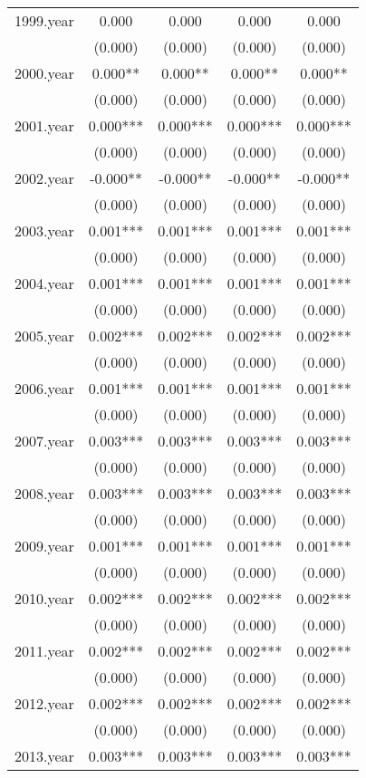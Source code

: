 \documentclass[]{article}
\begin{document}
\begin{tabular}{lcccc}
1999.year & 0.000 & 0.000 & 0.000 & 0.000 \\
 & (0.000) & (0.000) & (0.000) & (0.000) \\
2000.year & 0.000** & 0.000** & 0.000** & 0.000** \\
 & (0.000) & (0.000) & (0.000) & (0.000) \\
2001.year & 0.000*** & 0.000*** & 0.000*** & 0.000*** \\
 & (0.000) & (0.000) & (0.000) & (0.000) \\
2002.year & -0.000** & -0.000** & -0.000** & -0.000** \\
 & (0.000) & (0.000) & (0.000) & (0.000) \\
2003.year & 0.001*** & 0.001*** & 0.001*** & 0.001*** \\
 & (0.000) & (0.000) & (0.000) & (0.000) \\
2004.year & 0.001*** & 0.001*** & 0.001*** & 0.001*** \\
 & (0.000) & (0.000) & (0.000) & (0.000) \\
2005.year & 0.002*** & 0.002*** & 0.002*** & 0.002*** \\
 & (0.000) & (0.000) & (0.000) & (0.000) \\
2006.year & 0.001*** & 0.001*** & 0.001*** & 0.001*** \\
 & (0.000) & (0.000) & (0.000) & (0.000) \\
2007.year & 0.003*** & 0.003*** & 0.003*** & 0.003*** \\
 & (0.000) & (0.000) & (0.000) & (0.000) \\
2008.year & 0.003*** & 0.003*** & 0.003*** & 0.003*** \\
 & (0.000) & (0.000) & (0.000) & (0.000) \\
2009.year & 0.001*** & 0.001*** & 0.001*** & 0.001*** \\
 & (0.000) & (0.000) & (0.000) & (0.000) \\
2010.year & 0.002*** & 0.002*** & 0.002*** & 0.002*** \\
 & (0.000) & (0.000) & (0.000) & (0.000) \\
2011.year & 0.002*** & 0.002*** & 0.002*** & 0.002*** \\
 & (0.000) & (0.000) & (0.000) & (0.000) \\
2012.year & 0.002*** & 0.002*** & 0.002*** & 0.002*** \\
 & (0.000) & (0.000) & (0.000) & (0.000) \\
2013.year & 0.003*** & 0.003*** & 0.003*** & 0.003*** \\

\end{tabular}
\end{document}
